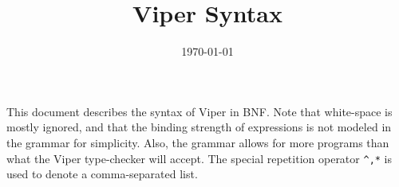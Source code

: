 \documentclass[]{article}
\title{Viper Syntax}
\date{\today}
\begin{document}
\maketitle


This document describes the syntax of Viper in BNF.  Note that white-space is
mostly ignored, and that the binding strength of expressions is not modeled
in the grammar for simplicity.  Also, the grammar allows for more programs
than what the Viper type-checker will accept.
The special repetition operator \lstinline[language=bnf]{^,*} is used to
denote a comma-separated list.


\lstset{language=bnf}

\end{document}
